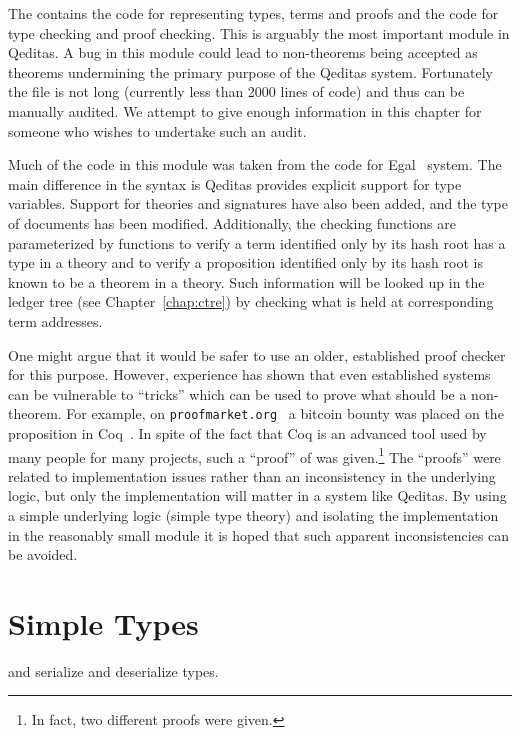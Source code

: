 The  contains the code for representing types,
terms and proofs
and the code for type checking and proof checking.
This is arguably the most important module in Qeditas.
A bug in this module could lead to non-theorems being accepted as theorems
undermining the primary purpose of the Qeditas system.
Fortunately the  file is not long (currently less than 2000 lines of code)
and thus can be manually audited.
We attempt to give enough information in this chapter for someone who wishes to undertake such an audit.

Much of the code in this module was taken from the code for Egal~\cite{Brown2014} system.
The main difference in the syntax is Qeditas provides explicit support for type variables.
Support for theories and signatures have also been added, and the type of documents has been modified.
Additionally, the checking functions are parameterized by functions to verify a term
identified only by its hash root has a type in a theory
and to verify a proposition identified only by its hash root is known to be a theorem in a theory.
Such information will be looked up in the ledger tree (see Chapter~\ref{chap:ctre}) by checking what is held at corresponding term addresses.

One might argue that it would be safer to use an older, established proof checker for this purpose.
However, experience has shown that even established systems can be vulnerable to ``tricks''
which can be used to prove what should be a non-theorem.
For example, on {\tt{proofmarket.org}}~\cite{ProofMarket}
a bitcoin bounty was placed on the proposition {} in Coq~\cite{Coq:manual}.
In spite of the fact that Coq is an advanced tool used by many people for many projects,
such a ``proof'' of {} was given.\footnote{In fact, two different proofs were given.}
The ``proofs'' were related to implementation issues rather than an inconsistency
in the underlying logic, but only the implementation will matter in a system like Qeditas.
By using a simple underlying logic (simple type theory)
and isolating the implementation in the reasonably small module {}
it is hoped that such apparent inconsistencies can be avoided.

\section{Simple Types}

{}

{} and {} serialize and deserialize types.

